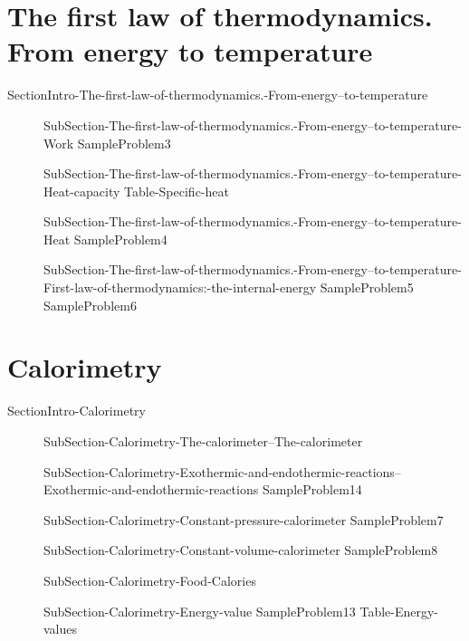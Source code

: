 \documentclass[main.tex]{subfiles}
\begin{document}
\section{The first law of thermodynamics. From energy  to temperature}
{SectionIntro-The-first-law-of-thermodynamics.-From-energy--to-temperature}
\sloppy\begin{description}
\item[] 
  {SubSection-The-first-law-of-thermodynamics.-From-energy--to-temperature-Work}
   {SampleProblem3}
\item[] 
  {SubSection-The-first-law-of-thermodynamics.-From-energy--to-temperature-Heat-capacity}
   {Table-Specific-heat}
\item[] 
  {SubSection-The-first-law-of-thermodynamics.-From-energy--to-temperature-Heat}
   {SampleProblem4}
\item[] 
  {SubSection-The-first-law-of-thermodynamics.-From-energy--to-temperature-First-law-of-thermodynamics:-the-internal-energy}
   {SampleProblem5}
   {SampleProblem6}
\end{description}

\section{Calorimetry}
{SectionIntro-Calorimetry}
\sloppy\begin{description}
\item[] 
  {SubSection-Calorimetry-The-calorimeter--The-calorimeter}
\item[]  {SubSection-Calorimetry-Exothermic-and-endothermic-reactions--Exothermic-and-endothermic-reactions}
  {SampleProblem14}
\item[] {SubSection-Calorimetry-Constant-pressure-calorimeter}
   {SampleProblem7}
\item[]  {SubSection-Calorimetry-Constant-volume-calorimeter}
   {SampleProblem8}
\hspace{-2cm}{Figure-Calorimeter}
\item[]  {SubSection-Calorimetry-Food-Calories}
\item[]  {SubSection-Calorimetry-Energy-value}
 {SampleProblem13}
 {Table-Energy-values}

\end{description}
     
\end{document}
